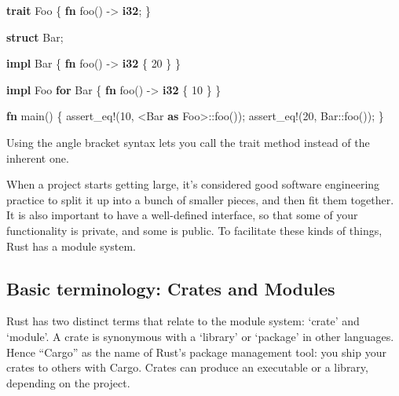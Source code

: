 \documentclass[a4paper,]{book}
\newenvironment{Shaded}{\begin{snugshade}}{\end{snugshade}}
\newcommand{\KeywordTok}[1]{\textcolor[rgb]{0.13,0.29,0.53}{\textbf{{#1}}}}
\newcommand{\DecValTok}[1]{\textcolor[rgb]{0.00,0.00,0.81}{{#1}}}
\newcommand{\OtherTok}[1]{\textcolor[rgb]{0.56,0.35,0.01}{{#1}}}
\newcommand{\NormalTok}[1]{{#1}}
\begin{document}
\begin{Shaded}
\begin{Highlighting}[]
\KeywordTok{trait} \NormalTok{Foo \{}
    \KeywordTok{fn} \NormalTok{foo() -> }\KeywordTok{i32}\NormalTok{;}
\NormalTok{\}}

\KeywordTok{struct} \NormalTok{Bar;}

\KeywordTok{impl} \NormalTok{Bar \{}
    \KeywordTok{fn} \NormalTok{foo() -> }\KeywordTok{i32} \NormalTok{\{}
        \DecValTok{20}
    \NormalTok{\}}
\NormalTok{\}}

\KeywordTok{impl} \NormalTok{Foo }\KeywordTok{for} \NormalTok{Bar \{}
    \KeywordTok{fn} \NormalTok{foo() -> }\KeywordTok{i32} \NormalTok{\{}
        \DecValTok{10}
    \NormalTok{\}}
\NormalTok{\}}

\KeywordTok{fn} \NormalTok{main() \{}
    \OtherTok{assert_eq!}\NormalTok{(}\DecValTok{10}\NormalTok{, <Bar }\KeywordTok{as} \NormalTok{Foo>::foo());}
    \OtherTok{assert_eq!}\NormalTok{(}\DecValTok{20}\NormalTok{, Bar::foo());}
\NormalTok{\}}
\end{Highlighting}
\end{Shaded}

Using the angle bracket syntax lets you call the trait method instead of
the inherent one.


When a project starts getting large, it's considered good software
engineering practice to split it up into a bunch of smaller pieces, and
then fit them together. It is also important to have a well-defined
interface, so that some of your functionality is private, and some is
public. To facilitate these kinds of things, Rust has a module system.

\subsection{Basic terminology: Crates and
Modules}\label{basic-terminology-crates-and-modules}

Rust has two distinct terms that relate to the module system: `crate'
and `module'. A crate is synonymous with a `library' or `package' in
other languages. Hence ``Cargo'' as the name of Rust's package
management tool: you ship your crates to others with Cargo. Crates can
produce an executable or a library, depending on the project.
\end{document}
